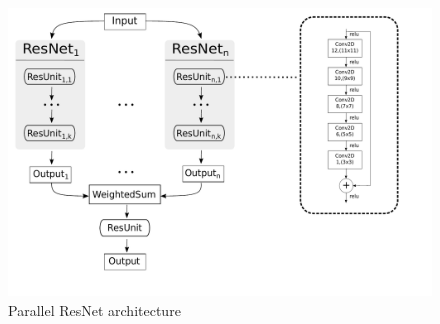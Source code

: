 \begin{figure}[h]
\centering
\includegraphics[width=\linewidth]{pics/nn.pdf}
\caption{Parallel ResNet architecture}
\label{nn}
\end{figure} 